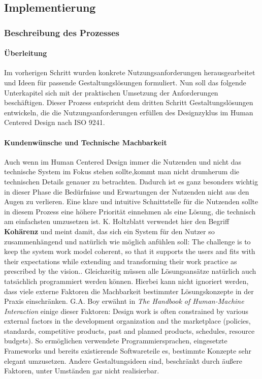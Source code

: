 \subsection{Implementierung}
\subsubsection{Beschreibung des Prozesses}

\paragraph{Überleitung}
Im vorherigen Schritt wurden konkrete Nutzungsanforderungen herausgearbeitet
und Ideen für passende Gestaltungslösungen formuliert. Nun soll das folgende
Unterkapitel sich mit der praktischen Umsetzung der Anforderungen beschäftigen.
Dieser Prozess entspricht dem dritten Schritt \glqq{}Gestaltungslösungen
entwickeln, die die Nutzungsanforderungen erfüllen\grqq{} des Designzyklus im
Human Centered Design nach ISO 9241\cite{iso9241}.

\paragraph{Kundenwünsche und Technische Machbarkeit}
Auch wenn im Human Centered Design immer die Nutzenden und nicht das technische
System im Fokus stehen sollte,kommt man nicht drumherum die technischen Details
genauer zu betrachten. Dadurch ist es ganz besonders wichtig in dieser Phase
die Bedürfnisse und Erwartungen der Nutzenden nicht aus den Augen zu verlieren.
Eine klare und intuitive Schnittstelle für die Nutzenden sollte in diesem
Prozess eine höhere Priorität einnehmen als eine Lösung, die technisch am
einfachsten umzusetzen ist. K. Holtzblatt verwendet hier den Begriff
\textbf{Kohärenz} und meint damit, das sich ein System für den Nutzer so
zusammenhängend und natürlich wie möglich anfühlen soll: \glqq{}The challenge
is to keep the system work model coherent, so that it supports the users and
fits with their expectations while extending and transforming their work
practice as prescribed by the vision.\grqq{}\cite{contextualDesign}.
Gleichzeitig müssen alle Lösungsansätze natürlich auch tatsächlich programmiert
werden können. Hierbei kann nicht ignoriert werden, dass viele externe Faktoren
die Machbarkeit bestimmter Lösungskonzepte in der Praxis einschränken. G.A. Boy
erwähnt in \textit{The Handbook of Human-Machine Interaction} einige dieser
Faktoren: \glqq{}Design work is often constrained by various external factors
in the development organization and the marketplace (policies, standards,
competitive products, past and planned products, schedules, resource
budgets).\grqq\cite{HMI-HCD} So ermöglichen verwendete Programmiersprachen,
eingesetzte Frameworks und bereits existierende Softwareteile es, bestimmte
Konzepte sehr elegant umzusetzen. Andere Gestaltungsideen sind, beschränkt
durch äußere Faktoren, unter Umständen gar nicht realisierbar.\cite{HMI-HCD}

